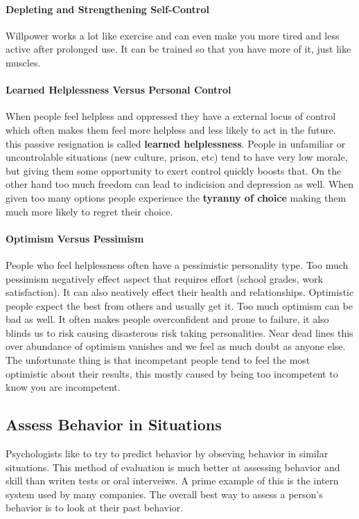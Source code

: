 \documentclass[12pt]{article}
\begin{document}
\paragraph*{Depleting and Strengthening Self-Control}
Willpower works a lot like exercise and can even make you more tired and less active after prolonged use. It can be trained so that you have more of it, just like muscles. 
\paragraph*{Learned Helplessness Versus Personal Control}
When people feel helpless and oppressed they have a external locus of control which often makes them feel more helpless and less likely to act in the future. this passive resignation is called \textbf{learned helplessness}. People in unfamiliar or uncontrolable situations (new culture, prison, etc) tend to have very low morale, but giving them some opportunity to exert control quickly boosts that. On the other hand too much freedom can lead to indicision and depression as well. When given too many options people experience the \textbf{tyranny of choice} making them much more likely to regret their choice.
\paragraph*{Optimism Versus Pessimism}
People who feel helplessness often have a pessimistic personality type. Too much pessimism negatively effect aspect that requires effort (school grades, work satisfaction). It can also neatively effect their health and relationships. Optimistic people expect the best from others and usually get it. Too much optimism can be bad as well. It often makes people overconfident and prone to failure, it also blinds us to risk causing disasterous risk taking personalities. Near dead lines this over abundance of optimism vanishes and we feel as much doubt as anyone else. The unfortunate thing is that incompetant people tend to feel the most optimistic about their results, this mostly caused by being too incompetent to know you are incompetent. 
\subsection*{Assess Behavior in Situations}
Psychologists like to try to predict behavior by obseving behavior in similar situations. This method of evaluation is much better at assessing behavior and skill than writen tests or oral interveiws. A prime example of this is the intern system  used by many companies. The overall best way to assess a person's behavior is to look at their past behavior.
\end{document}

